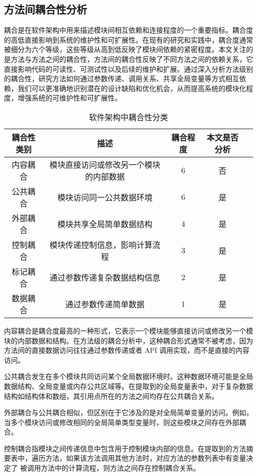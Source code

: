 \subsection{方法间耦合性分析}

耦合是在软件架构中用来描述模块间相互依赖和连接程度的一个重要指标。耦合度的高低直接影响到系统的维护性和可扩展性。在现有的研究和实践中，耦合度通常被细分为六个等级，这些等级从高到低反映了模块间依赖的紧密程度。本文关注的是方法与方法之间的耦合性，方法间的耦合性反映了不同方法之间的依赖关系，它直接影响代码的可读性、可测试性以及后续的维护和扩展。通过深入分析方法级别的耦合性，研究方法如何通过参数传递、调用关系、共享全局变量等方式相互依赖，我们可以更准确地识别潜在的设计缺陷和优化机会，从而提高系统的模块化程度，增强系统的可维护性和可扩展性。

\begin{table}[htbp]
\caption{软件架构中耦合性分类}
\vspace{0.5em}\centering\wuhao
\begin{tabular}{ccccc}
\toprule
耦合性类别 & 描述 & 耦合程度 & 本文是否分析 \\
\midrule
内容耦合 & 模块直接访问或修改另一个模块的内部数据 & 6 & 否\\
公共耦合 & 模块访问同一公共数据环境 & 6 & 是 \\
外部耦合 & 模块共享全局简单数据结构 & 4 & 是 \\
控制耦合 & 模块传递控制信息，影响计算流程 & 3 & 是 \\
标记耦合 & 通过参数传递复杂数据结构信息 & 2 & 是 \\
数据耦合 & 通过参数传递简单数据 & 1 & 是 \\
\bottomrule
\end{tabular}
\end{table}


内容耦合是耦合度最高的一种形式，它表示一个模块能够直接访问或修改另一个模块的内部数据和结构。在方法级的耦合分析中，这种耦合形式通常不被考虑，因为方法间的直接数据访问往往通过参数传递或者 API 调用实现，而不是直接的内容访问。

公共耦合发生在多个模块共同访问某个全局数据环境时。这种数据环境可能是全局数据结构、全局变量或内存公共区域等。在提取到的全局变量表中，对于复杂数据结构如结构体和数组，其引用点所在的方法之间均存在公共耦合关系。


外部耦合与公共耦合相似，但区别在于它涉及的是对全局简单变量的访问。例如，当多个模块访问或修改相同的全局简单类型变量时，则这些模块之间存在外部耦合。


控制耦合指模块之间传递信息中包含用于控制模块内部的信息。在提取到的方法摘
要表中，遍历方法，如果该方法调用其他方法时，对应方法的参数列表中有变量决定了
被调用方法中的计算流程，则方法之间存在控制耦合关系。


